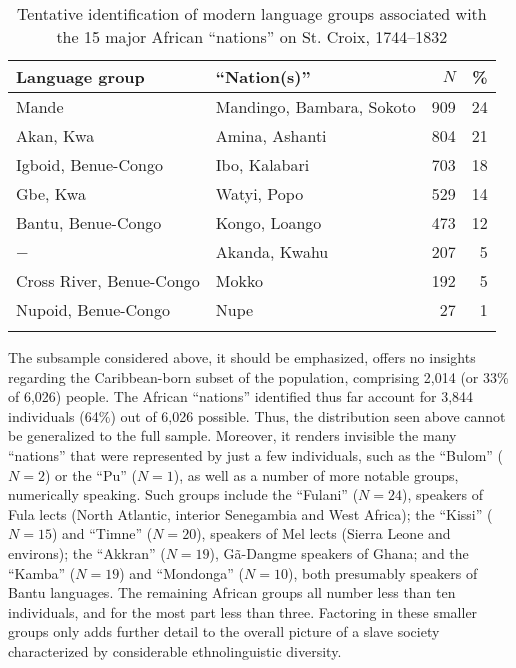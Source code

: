 \documentclass[output=paper,colorlinks,citecolor=brown]{langscibook}
\begin{document}
\begin{table}
\begin{tabular}{llrr}
    \lsptoprule
    {Language group} & {“Nation(s)”} & {$N$} & {\%} \\ \midrule
    Mande & Mandingo, Bambara, Sokoto & 909 & 24 \\
    Akan, Kwa & Amina, Ashanti & 804 & 21 \\
    Igboid, Benue-Congo & Ibo, Kalabari & 703 & 18 \\
    Gbe, Kwa & Watyi, Popo & 529 & 14 \\
    Bantu, Benue-Congo & Kongo, Loango & 473 & 12 \\
    − & Akanda, Kwahu & 207 & 5 \\
    Cross River, Benue-Congo & Mokko & 192 & 5 \\
    Nupoid, Benue-Congo & Nupe & 27 & 1 \\ \lspbottomrule
\end{tabular}
\caption{Tentative identification of modern language groups associated with the 15 major African “nations” on St. Croix, 1744–1832}
\label{tab:tab8_02}
\end{table}

The subsample considered above, it should be emphasized, offers no insights regarding the Caribbean-born subset of the population, comprising 2,014 (or 33\% of 6,026) people. The African ``nations'' identified thus far account for 3,844 individuals (64\%) out of 6,026 possible. Thus, the distribution seen above cannot be generalized to the full sample. Moreover, it renders invisible the many ``nations'' that were represented by just a few individuals, such as the ``Bulom'' ($N=2$) or the ``Pu'' ($N=1$), as well as a number of more notable groups, numerically speaking. Such groups include the ``Fulani'' ($N=24$), speakers of Fula lects (North Atlantic, interior Senegambia and West Africa); the ``Kissi'' ($N=15$) and ``Timne'' ($N=20$), speakers of Mel lects (Sierra Leone and environs); the ``Akkran'' ($N=19$), G\~a-Dangme speakers of Ghana; and the ``Kamba'' ($N=19$) and ``Mondonga'' ($N=10$), both presumably speakers of Bantu languages. The remaining African groups all number less than ten individuals, and for the most part less than three. Factoring in these smaller groups only adds further detail to the overall picture of a slave society characterized by considerable ethnolinguistic diversity.
\end{document}
